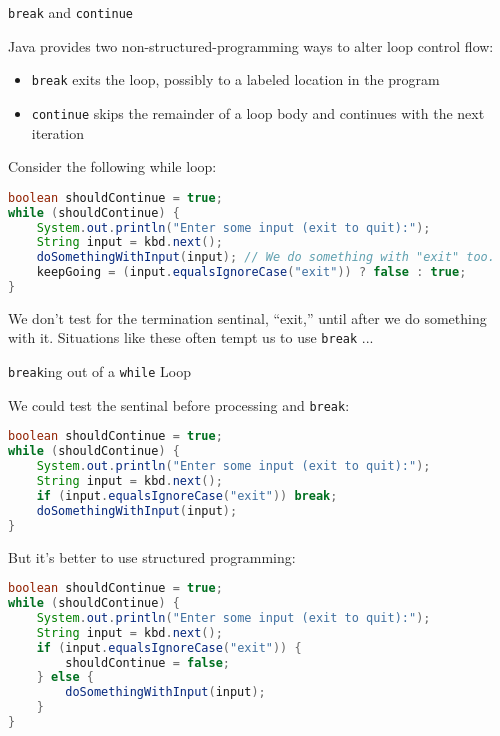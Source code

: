 \documentclass{beamer}
\begin{document}
\begin{frame}[fragile]{{\tt break} and {\tt continue}}


Java provides two non-structured-programming ways to alter loop control flow:
\begin{itemize}
\item {\tt break} exits the loop, possibly to a labeled location in the program
\item {\tt continue} skips the remainder of a loop body and continues with the next iteration
\end{itemize}

Consider the following while loop:
\begin{lstlisting}[language=Java]
boolean shouldContinue = true;
while (shouldContinue) {
    System.out.println("Enter some input (exit to quit):");
    String input = kbd.next();
    doSomethingWithInput(input); // We do something with "exit" too.
    keepGoing = (input.equalsIgnoreCase("exit")) ? false : true;
}
\end{lstlisting}
We don't test for the termination sentinal, ``exit,'' until after we do something with it.  Situations like these often tempt us to use {\tt break} ...

\end{frame}

\begin{frame}[fragile]{{\tt break}ing out of a {\tt while} Loop}


We could test the sentinal before processing and {\tt break}:
\vspace{-.05in}
\begin{lstlisting}[language=Java]
boolean shouldContinue = true;
while (shouldContinue) {
    System.out.println("Enter some input (exit to quit):");
    String input = kbd.next();
    if (input.equalsIgnoreCase("exit")) break;
    doSomethingWithInput(input);
}
\end{lstlisting}
\vspace{-.1in}
But it's better to use structured programming:
\vspace{-.05in}
\begin{lstlisting}[language=Java]
boolean shouldContinue = true;
while (shouldContinue) {
    System.out.println("Enter some input (exit to quit):");
    String input = kbd.next();
    if (input.equalsIgnoreCase("exit")) {
        shouldContinue = false;
    } else {
        doSomethingWithInput(input);
    }
}
\end{lstlisting}


\end{frame}
\end{document}
